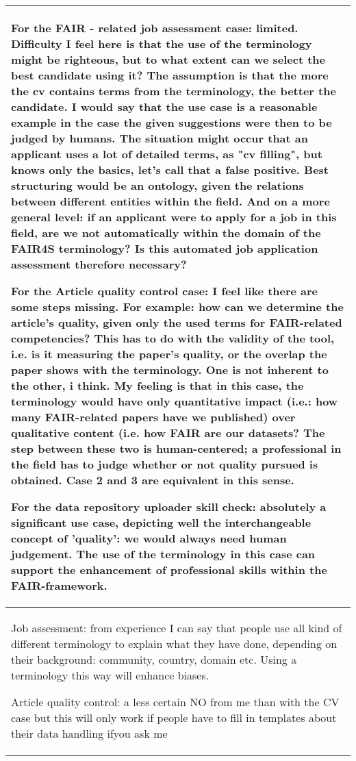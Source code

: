 \documentclass[]{article}
\begin{document}
\begin{table}[H]
\begin{tabular}{>{\raggedright\arraybackslash\columncolor{khaki}}p{30em}}
\hline
For the FAIR - related job assessment case: limited. Difficulty I feel here is that the use of the terminology might be righteous, but to what extent can we select the best candidate using it? The assumption is that the more the cv contains terms from the terminology, the better the candidate. I would say that the use case is a reasonable example in the case the given suggestions were then to be judged by humans. The situation might occur that an applicant uses a lot of detailed terms, as "cv filling", but knows only the basics, let's call that a false positive. Best structuring would be an ontology, given the relations between different entities within the field. And on a more general level: if an applicant were to apply for a job in this field, are we not automatically within the domain of the FAIR4S terminology? Is this automated job application assessment therefore necessary?

For the Article quality control case: I feel like there are some steps missing. For example: how can we determine the article's quality, given only the used terms for FAIR-related competencies? This has to do with the validity of the tool, i.e. is it measuring the paper's quality, or the overlap the paper shows with the terminology. One is not inherent to the other, i think. My feeling is that in this case, the terminology would have only quantitative impact (i.e.: how many FAIR-related papers have we published) over qualitative content (i.e. how FAIR are our datasets? The step between these two is human-centered; a professional in the field has to judge whether or not quality pursued is obtained. Case 2 and 3 are equivalent in this sense.

For the data repository uploader skill check: absolutely a significant use case, depicting well the interchangeable concept of 'quality': we would always need human judgement. The use of the terminology in this case can support the enhancement of professional skills within the FAIR-framework.\\
\hline
Job assessment: from experience I can say that people use all kind of different terminology to explain what they have done, depending on their background:  community, country, domain etc. Using a terminology this way will enhance biases.

Article quality control: a less certain NO from me than with the CV case but this will only work if people have to fill in templates about their data handling ifyou ask me\\
\hline
\end{tabular}
\end{table}
\end{document}
